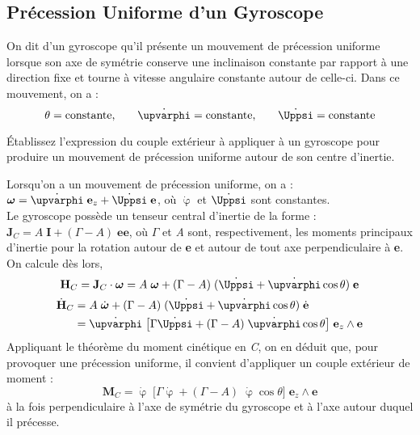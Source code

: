 \documentclass[a4paper]{article}
\begin{document}
\subsection{Précession Uniforme d'un Gyroscope}





On dit d’un gyroscope qu’il présente un mouvement de précession uniforme lorsque son axe de symétrie conserve une inclinaison constante par rapport à une direction fixe et tourne à vitesse angulaire constante autour de celle-ci. Dans ce mouvement, on a :
\[ \theta = \text{constante,} \qquad \dot{\upvarphi} = \text{constante,} \qquad \dot{\Uppsi} = \text{constante} \]

\begin{siderules}
Établissez l’expression du couple extérieur à appliquer à un gyroscope pour produire un mouvement de précession uniforme autour de son centre d’inertie.
\end{siderules}

 Lorsqu'on a un mouvement de précession uniforme, on a : $\displaystyle \boldsymbol{\omega} = \dot{\upvarphi} \; \textbf{e}_z + \dot{\Uppsi} \; \textbf{e} $, où $ \dot{\upvarphi} $ et $ \dot{\Uppsi} $ sont constantes. \\
Le gyroscope possède un tenseur central d'inertie de la forme : $\displaystyle \textbf{J}_C = A \; \textbf{I} + (\Gamma - A) \; \textbf{e} \textbf{e} $, où $ \Gamma $ et \emph{A} sont, respectivement, les moments principaux d’inertie pour la rotation autour de \textbf{e} et autour de tout axe perpendiculaire à \textbf{e}. \\
On calcule dès lors, 
\[ \textbf{H}_C = \textbf{J}_C \cdot \boldsymbol{\omega} = A \; \boldsymbol{\omega} + (\Gamma - A) \; (\dot{\Uppsi} + \dot{\upvarphi} \cos \theta) \; \textbf{e} \]
\[ \begin{aligned}
\dot{\textbf{H}}_C &= A \; \dot{\boldsymbol{\omega}} + (\Gamma - A) \; (\dot{\Uppsi} + \dot{\upvarphi} \cos \theta) \; \dot{\textbf{e}} \\
&= \dot{\upvarphi} \; \big[ \Gamma \dot{\Uppsi} + (\Gamma - A) \; \dot{\upvarphi} \cos \theta \big] \; \textbf{e}_z \wedge \textbf{e}
\end{aligned} \]
Appliquant le théorème du moment cinétique en \emph{C}, on en déduit que, pour provoquer une précession uniforme, il convient d’appliquer un couple extérieur de moment : 
\[ \textbf{M}_C = \dot{\upvarphi} \; \big[ \Gamma \dot{\upvarphi} + (\Gamma - A) \; \dot{\upvarphi} \cos \theta \big] \; \textbf{e}_z \wedge \textbf{e} \]
à la fois perpendiculaire à l’axe de symétrie du gyroscope et à l’axe autour duquel il précesse.
\end{document}
